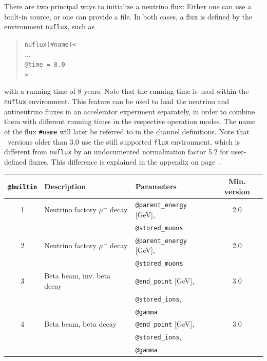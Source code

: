 There are two principal ways to initialize a neutrino flux: 
Either one can use 
a built-in source, or one can provide a file. In both cases,
a flux is defined by the environment {\tt nuflux}, such as
\begin{quote}
  {\tt nuflux(\#name)<\\
\tb $\ldots$\\
\tb @time = 8.0 \\
>}
\end{quote}
with a running time of $8$ years. Note that the running time is used within
the {\tt nuflux} environment. This feature can be used to load the neutrino
and antineutrino fluxes in an accelerator experiment separately, in order
to combine them with different running times in the respective operation modes.
The name of the flux {\tt \#name} will later be referred to in the channel definitions. Note that \GLOBES\ versions older than 3.0 use the still supported {\tt flux} environment, which is different from {\tt nuflux} by an undocumented normalization factor 5.2 for user-defined fluxes. This difference is explained in the appendix on page~\pageref{app:flux}.


\begin{table}[t]
\begin{center}
\begin{tabular}{|cllc|}
\hline
{\tt @builtin} & Description & Parameters & Min. version \\
\hline
1 & Neutrino factory $\mu^+$ decay & {\tt @parent\_energy} [GeV], & 2.0 \\
& & {\tt @stored\_muons} &  \\
2 & Neutrino factory $\mu^-$ decay & {\tt @parent\_energy} [GeV], & 2.0 \\
& & {\tt @stored\_muons} &  \\
3 & Beta beam, inv. beta decay & {\tt @end\_point} [GeV], & 3.0 \\
& & {\tt @stored\_ions}, &  \\
& & {\tt @gamma} & \\
4 & Beta beam, beta decay & {\tt @end\_point} [GeV], & 3.0 \\
& & {\tt @stored\_ions}, &  \\
& & {\tt @gamma} & \\
\hline
\end{tabular}
\end{center}
\end{table}

